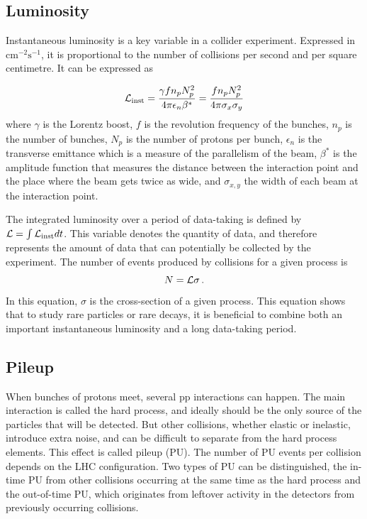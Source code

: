 \subsection{Luminosity}

Instantaneous luminosity is a key variable in a collider experiment. Expressed in $\mathrm{cm^{-2} s^{-1}}$, it is proportional to the number of collisions per second and per square centimetre. It can be expressed as

\begin{equation}
    \mathcal{L}_{\rm{inst}} = \frac{\gamma f n_p N_p^2}{4\pi \epsilon_n \beta^{*}} = \frac{f n_p N_p^2}{4\pi \sigma_x \sigma_y}
\end{equation}
where $\gamma$ is the Lorentz boost, $f$ is the revolution frequency of the bunches, $n_p$ is the number of bunches, $N_p$ is the number of protons per bunch, $\epsilon_n$ is the transverse emittance which is a measure of the parallelism of the beam, $\beta^*$ is the amplitude function that measures the distance between the interaction point and the place where the beam gets twice as wide, and $\sigma_{x,y}$ the width of each beam at the interaction point.

The integrated luminosity over a period of data-taking is defined by $\mathcal{L} = \int \mathcal{L}_{\rm{inst}} dt$. This variable denotes the quantity of data, and therefore represents the amount of data that can potentially be collected by the experiment. The number of events produced by collisions for a given process is 
\begin{equation}
    N = \Lagr \sigma \mend
\end{equation}
In this equation, $\sigma$ is the cross-section of a given process. This equation shows that to study rare particles or rare decays, it is beneficial to combine both an important instantaneous luminosity and a long data-taking period.

\subsection{Pileup}

When bunches of protons meet, several pp interactions can happen. The main interaction is called the hard process, and ideally should be the only source of the particles that will be detected. But other collisions, whether elastic or inelastic, introduce extra noise, and can be difficult to separate from the hard process elements. This effect is called pileup (PU). The number of PU events per collision depends on the LHC configuration. Two types of PU can be distinguished, the in-time PU from other collisions occurring at the same time as the hard process and the out-of-time PU, which originates from leftover activity in the detectors from previously occurring collisions.

